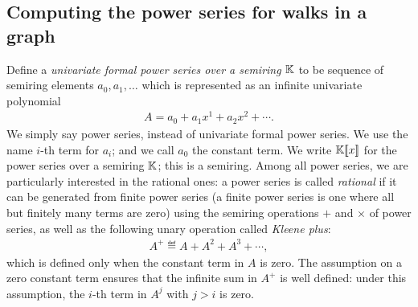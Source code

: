 \subsection{Computing the power series for walks in a graph}
\label{sec:power-series}
Define a \emph{univariate formal power series over a semiring $\mathbb K$} to be  sequence of semiring elements $a_0,a_1,\ldots$ which is represented as an infinite univariate polynomial
\begin{align*}
 A = a_0 + a_1x^1 + a_2x^2 + \cdots.
\end{align*}
We simply say power series, instead of univariate formal power series.
We use the name $i$-th term for $a_i$; and we call $a_0$ the constant term.
We write $\mathbb K [\![x]\!]$ for the  power series over a semiring $\mathbb K$; this is a semiring. Among all power series, we are particularly interested in the rational ones: a power series is called \emph{rational} if it can be generated from finite power series (a finite power series is one where all but finitely many terms are zero) using the semiring operations $+$ and $\times$ of power series, as well as the following unary  operation called \emph{Kleene plus}:
\begin{align*}
 A^+ \eqdef A + A^2 + A^3 + \cdots,
\end{align*}   
which  is defined only when the constant term   in $A$ is zero. The assumption on a zero constant term ensures that the infinite sum in $A^+$ is well defined: under this assumption, the $i$-th term in $A^j$ with $j>i$ is zero. 


